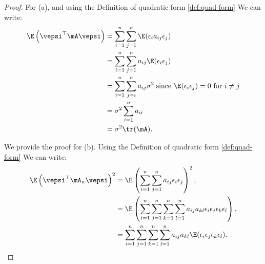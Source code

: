 \documentclass[english,12pt]{book}\usepackage[]{graphicx}\usepackage[]{xcolor}
\begin{document}

\begin{proof}
For (a), and using the Definition of quadratic form \ref{def:quad-form} We can write:
\begin{equation*}
\begin{aligned}
\E\left(\vepsi^\top\mA\vepsi\right) &= \sum_{i = 1}^n\sum_{j = 1}^n\E(\epsilon_i a_{ij}\epsilon_j) \\
& = \sum_{i = 1}^n\sum_{j = 1}^na_{ij}\E(\epsilon_i\epsilon_j) \\
& = \sum_{i = 1}^n\sum_{j = i}^na_{ij}\sigma^2\;\mbox{since $\E(\epsilon_i\epsilon_j) = 0$ for $i\neq j$} \\
& = \sigma^2\sum_{i = 1}^n a_{ii}\\
& = \sigma^2\tr(\mA).
\end{aligned}
\end{equation*}

We provide the proof for (b). Using the Definition of quadratic form \ref{def:quad-form} We can write:
\begin{equation*}
\begin{aligned}
\E\left(\vepsi^\top\mA_n\vepsi\right)^2 & = \E\left(\sum_{i = 1}^n\sum_{j = 1}^na_{ij}\epsilon_i\epsilon_j\right)^2,\\
& = \E\left(\sum_{i = 1}^n\sum_{j= 1}^n\sum_{k = 1}^n\sum_{l = 1}^n a_{ij}a_{kl}\epsilon_{i}\epsilon_j\epsilon_k\epsilon_l\right), \\
&  = \sum_{i = 1}^n\sum_{j= 1}^n\sum_{k = 1}^n\sum_{l = 1}^n a_{ij}a_{kl}\E(\epsilon_{i}\epsilon_j\epsilon_k\epsilon_l).
\end{aligned}
\end{equation*}


\end{proof}
\end{document}
